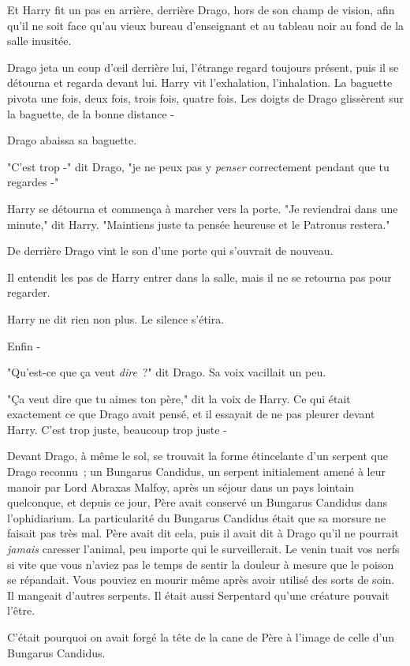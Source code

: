 Et Harry fit un pas en arrière, derrière Drago, hors de son champ de vision, afin qu'il ne soit face qu'au vieux bureau d'enseignant et au tableau noir au fond de la salle inusitée.

Drago jeta un coup d'œil derrière lui, l'étrange regard toujours présent, puis il se détourna et regarda devant lui. Harry vit l'exhalation, l'inhalation. La baguette pivota une fois, deux fois, trois fois, quatre fois. Les doigts de Drago glissèrent sur la baguette, de la bonne distance -

Drago abaissa sa baguette.

"C'est trop -" dit Drago, "je ne peux pas y \emph{penser} correctement pendant que tu regardes -"

Harry se détourna et commença à marcher vers la porte. "Je reviendrai dans une minute," dit Harry. "Maintiens juste ta pensée heureuse et le Patronus restera."

\later

De derrière Drago vint le son d'une porte qui s'ouvrait de nouveau.

Il entendit les pas de Harry entrer dans la salle, mais il ne se retourna pas pour regarder.

Harry ne dit rien non plus. Le silence s'étira.

Enfin -

"Qu'est-ce que ça veut \emph{dire}~?" dit Drago. Sa voix vacillait un peu.

"Ça veut dire que tu aimes ton père," dit la voix de Harry. Ce qui était exactement ce que Drago avait pensé, et il essayait de ne pas pleurer devant Harry. C'est trop juste, beaucoup trop juste -

Devant Drago, à même le sol, se trouvait la forme étincelante d'un serpent que Drago reconnu~; un Bungarus Candidus, un serpent initialement amené à leur manoir par Lord Abraxas Malfoy, après un séjour dans un pays lointain quelconque, et depuis ce jour, Père avait conservé un Bungarus Candidus dans l'ophidiarium. La particularité du Bungarus Candidus était que sa morsure ne faisait pas très mal. Père avait dit cela, puis il avait dit à Drago qu'il ne pourrait \emph{jamais} caresser l'animal, peu importe qui le surveillerait. Le venin tuait vos nerfs si vite que vous n'aviez pas le temps de sentir la douleur à mesure que le poison se répandait. Vous pouviez en mourir même après avoir utilisé des sorts de soin. Il mangeait d'autres serpents. Il était aussi Serpentard qu'une créature pouvait l'être.

C'était pourquoi on avait forgé la tête de la cane de Père à l'image de celle d'un Bungarus Candidus.

